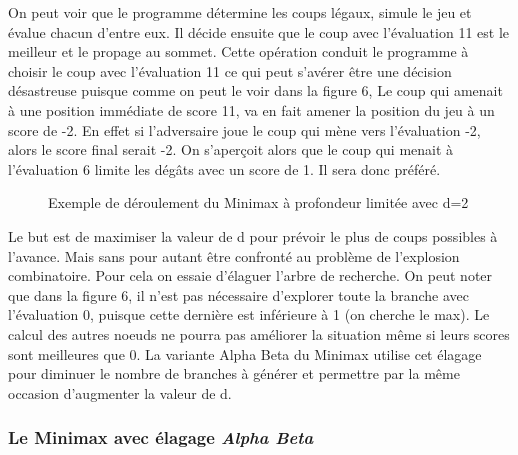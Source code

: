 \documentclass[11pt]{article}
\newcommand{\tmem}[1]{{\em #1\/}}
\begin{document}
On peut voir que le programme détermine les coups légaux, simule le
jeu et évalue chacun d'entre eux. Il décide ensuite que le coup avec
l'évaluation 11 est le meilleur et le propage au sommet. Cette
opération conduit le programme à choisir le coup avec l'évaluation
11 ce qui peut s'avérer être une décision désastreuse puisque
comme on peut le voir dans la figure 6, Le coup qui amenait à une position
immédiate de score 11, va en fait amener la position du jeu à un score
de -2. En effet si l'adversaire joue le coup qui mène vers
l'évaluation -2, alors le score final serait -2. On s'aper{\c c}oit alors
que le coup qui menait à l'évaluation 6 limite les dég{\^a}ts avec
un score de 1. Il sera donc préféré.

\begin{figure}[h]
  \caption {Exemple de déroulement du Minimax à profondeur limitée avec d=2}
  \noindent{}
\end{figure}

Le but est de maximiser la valeur de d pour prévoir le plus de coups
possibles à l'avance. Mais sans pour autant être confronté au
problème de l'explosion combinatoire. Pour cela on essaie d'élaguer
l'arbre de recherche. On peut noter que dans la figure 6, il n'est pas
nécessaire d'explorer toute la branche avec l'évaluation 0, puisque
cette dernière est inférieure à 1 (on cherche le max). Le calcul
des autres noeuds ne pourra pas améliorer la situation même si leurs
scores sont meilleures que 0. La variante Alpha Beta du Minimax utilise cet
élagage pour diminuer le nombre de branches à générer et
permettre par la même occasion d'augmenter la valeur de d.

\subsubsection{Le Minimax avec élagage {\tmem{Alpha Beta}}}
\end{document}
